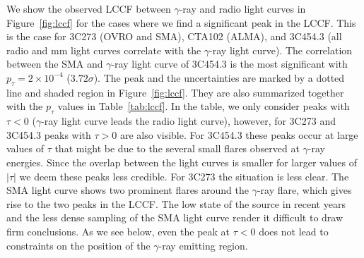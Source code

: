 \documentclass[twocolumn,linenumbers]{aastex62}
\newcommand{\gray}{$\gamma$-ray\xspace}
\begin{document}
We show the observed LCCF between \gray and radio light curves in Figure~\ref{fig:lccf} for the cases where we find a significant peak in the LCCF. This is the case for 3C273 (OVRO and SMA), CTA102 (ALMA), and 3C454.3 (all radio and mm light curves correlate with the \gray light curve).
The correlation between the SMA and \gray light curve of 3C454.3 is the most significant with $p_\tau = 2\times10^{-4}$ ($3.72\sigma$). 
The peak and the uncertainties are marked by a dotted line and shaded region in Figure~\ref{fig:lccf}.
They are also summarized together with the $p_\tau$ values in Table~\ref{tab:lccf}.
In the table, we only consider peaks with $\tau < 0$ (\gray light curve leads the radio light curve), however, 
for 3C273 and 3C454.3 peaks with $\tau > 0$ are also visible. 
For 3C454.3 these peaks occur at large values of $\tau$ that might be due to the several small flares observed at \gray energies. Since the overlap between the light curves is smaller for larger values of $|\tau|$ we deem these peaks less credible. 
For 3C273 the situation is less clear. 
The SMA light curve shows two prominent flares around the 
\gray flare, which gives rise to the two peaks in the LCCF. 
The low state of the source in recent years and the less dense sampling of the SMA light curve render it difficult to draw firm conclusions. As we see below, even the peak at $\tau < 0$ does not lead to constraints on the position of the \gray emitting region.
\end{document}
